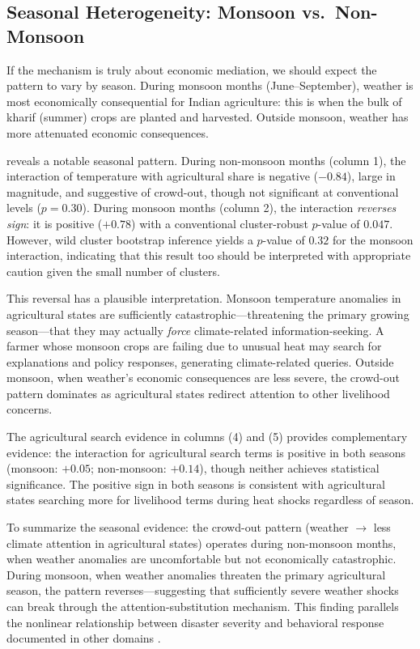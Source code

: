 \documentclass[12pt]{article}
\begin{document}
\subsection{Seasonal Heterogeneity: Monsoon vs.\ Non-Monsoon}

If the mechanism is truly about economic mediation, we should expect the pattern to vary by season. During monsoon months (June--September), weather is most economically consequential for Indian agriculture: this is when the bulk of kharif (summer) crops are planted and harvested. Outside monsoon, weather has more attenuated economic consequences.

 reveals a notable seasonal pattern. During non-monsoon months (column 1), the interaction of temperature with agricultural share is negative ($-0.84$), large in magnitude, and suggestive of crowd-out, though not significant at conventional levels ($p = 0.30$). During monsoon months (column 2), the interaction \textit{reverses sign}: it is positive ($+0.78$) with a conventional cluster-robust $p$-value of $0.047$. However, wild cluster bootstrap inference yields a $p$-value of $0.32$ for the monsoon interaction, indicating that this result too should be interpreted with appropriate caution given the small number of clusters.



This reversal has a plausible interpretation. Monsoon temperature anomalies in agricultural states are sufficiently catastrophic---threatening the primary growing season---that they may actually \textit{force} climate-related information-seeking. A farmer whose monsoon crops are failing due to unusual heat may search for explanations and policy responses, generating climate-related queries. Outside monsoon, when weather's economic consequences are less severe, the crowd-out pattern dominates as agricultural states redirect attention to other livelihood concerns.

The agricultural search evidence in columns (4) and (5) provides complementary evidence: the interaction for agricultural search terms is positive in both seasons (monsoon: $+0.05$; non-monsoon: $+0.14$), though neither achieves statistical significance. The positive sign in both seasons is consistent with agricultural states searching more for livelihood terms during heat shocks regardless of season.

To summarize the seasonal evidence: the crowd-out pattern (weather $\rightarrow$ less climate attention in agricultural states) operates during non-monsoon months, when weather anomalies are uncomfortable but not economically catastrophic. During monsoon, when weather anomalies threaten the primary agricultural season, the pattern reverses---suggesting that sufficiently severe weather shocks can break through the attention-substitution mechanism. This finding parallels the nonlinear relationship between disaster severity and behavioral response documented in other domains \citep{gallagher2014learning}.
\end{document}
